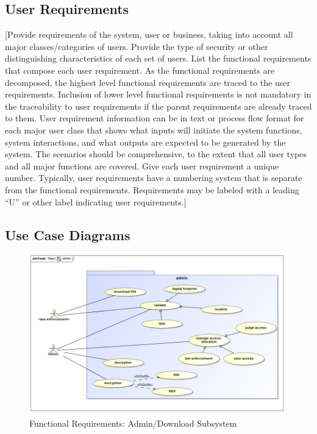 \documentclass[a4paper,12pt]{article}
\begin{document}
\subsection{User Requirements}
[Provide requirements of the system, user or business, taking into account all major classes/categories of users.  Provide the type of security or other distinguishing characteristics of each set of users.  List the functional requirements that compose each user requirement.  As the functional requirements are decomposed, the highest level functional requirements are traced to the user requirements.  Inclusion of lower level functional requirements is not mandatory in the traceability to user requirements if the parent requirements are already traced to them.
User requirement information can be in text or process flow format for each major user class that shows what inputs will initiate the system functions, system interactions, and what outputs are expected to be generated by the system.  The scenarios should be comprehensive, to the extent that all user types and all major functions are covered.  Give each user requirement a unique number.  Typically, user requirements have a numbering system that is separate from the functional requirements.  Requirements may be labeled with a leading “U” or other label indicating user requirements.]


\subsection{Use Case Diagrams}

\begin{figure}[H]
\includegraphics[width=1.0\textwidth]{images/admin.jpg}
\caption{Functional Requirements: Admin/Download Subsystem \label{overflow}}
\end{figure}
\end{document}
